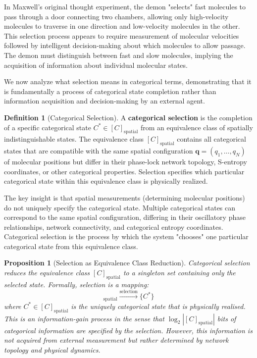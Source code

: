 \documentclass[12pt,a4paper]{article}
\newtheorem{proposition}[theorem]{Proposition}
\theoremstyle{definition}
\newtheorem{definition}[theorem]{Definition}
\theoremstyle{remark}
\begin{document}
In Maxwell's original thought experiment, the demon "selects" fast molecules to pass through a door connecting two chambers, allowing only high-velocity molecules to traverse in one direction and low-velocity molecules in the other. This selection process appears to require measurement of molecular velocities followed by intelligent decision-making about which molecules to allow passage. The demon must distinguish between fast and slow molecules, implying the acquisition of information about individual molecular states.

We now analyze what selection means in categorical terms, demonstrating that it is fundamentally a process of categorical state completion rather than information acquisition and decision-making by an external agent.

\begin{definition}[Categorical Selection]
\label{def:categorical_selection}
A \textbf{categorical selection} is the completion of a specific categorical state $C^* \in [C]_{\text{spatial}}$ from an equivalence class of spatially indistinguishable states. The equivalence class $[C]_{\text{spatial}}$ contains all categorical states that are compatible with the same spatial configuration $\mathbf{q} = (q_1, \ldots, q_N)$ of molecular positions but differ in their phase-lock network topology, S-entropy coordinates, or other categorical properties. Selection specifies which particular categorical state within this equivalence class is physically realized.
\end{definition}

The key insight is that spatial measurements (determining molecular positions) do not uniquely specify the categorical state. Multiple categorical states can correspond to the same spatial configuration, differing in their oscillatory phase relationships, network connectivity, and categorical entropy coordinates. Categorical selection is the process by which the system "chooses" one particular categorical state from this equivalence class.

\begin{proposition}[Selection as Equivalence Class Reduction]
\label{prop:selection_reduction}
Categorical selection reduces the equivalence class $[C]_{\text{spatial}}$ to a singleton set containing only the selected state. Formally, selection is a mapping:
\begin{equation}
[C]_{\text{spatial}} \xrightarrow{\text{selection}} \{C^*\}
\end{equation}
where $C^* \in [C]_{\text{spatial}}$ is the uniquely categorical state that is physically realised. This is an information-gain process in the sense that $\log_2 |[C]_{\text{spatial}}|$ bits of categorical information are specified by the selection. However, this information is not acquired from external measurement but rather determined by network topology and physical dynamics.
\end{proposition}
\end{document}
